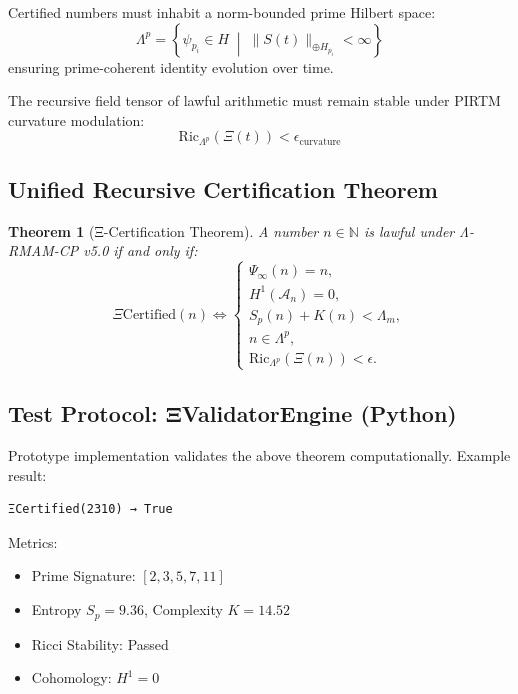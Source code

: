 \documentclass[12]{amsart}
\theoremstyle{plain}
\newtheorem{theorem}{Theorem}[section]
\begin{document}
\begin{axiom}
Certified numbers must inhabit a norm-bounded prime Hilbert space:
\[
\Lambda^p = \left\{ \psi_{p_i} \in H \;\middle|\; \|S(t)\|_{\oplus H_{p_i}} < \infty \right\}
\]
ensuring prime-coherent identity evolution over time.
\end{axiom}

\begin{axiom}
The recursive field tensor of lawful arithmetic must remain stable under PIRTM curvature modulation:
\[
\text{Ric}_{\Lambda^p}(\Xi(t)) < \epsilon_\text{curvature}
\]
\end{axiom}

\subsection*{Unified Recursive Certification Theorem}

\begin{theorem}[Ξ-Certification Theorem]
A number $n \in \mathbb{N}$ is lawful under Λ-RMAM-CP v5.0 if and only if:
\[
\boxed{
\Xi\text{Certified}(n) \iff
\begin{cases}
\Psi_\infty(n) = n,\\
H^1(\mathcal{A}_n) = 0,\\
S_p(n) + K(n) < \Lambda_m,\\
n \in \Lambda^p,\\
\text{Ric}_{\Lambda^p}(\Xi(n)) < \epsilon.
\end{cases}
}
\]
\end{theorem}

\subsection*{Test Protocol: ΞValidatorEngine (Python)}

Prototype implementation validates the above theorem computationally. Example result:

\begin{verbatim}
ΞCertified(2310) → True
\end{verbatim}

Metrics:
\begin{itemize}
    \item Prime Signature: $[2, 3, 5, 7, 11]$
    \item Entropy $S_p = 9.36$, Complexity $K = 14.52$
    \item Ricci Stability: Passed
    \item Cohomology: $H^1 = 0$
\end{itemize}
\end{document}
